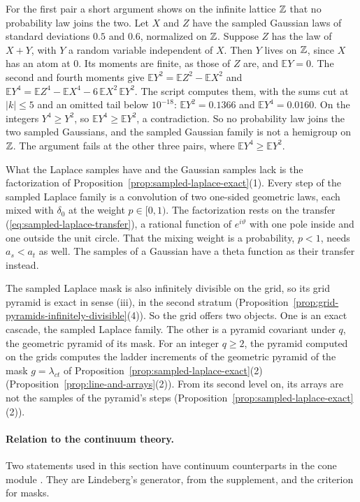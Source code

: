 For the first pair a short argument shows on the infinite lattice $\mathbb{Z}$ that no probability law
joins the two. Let $X$ and $Z$ have the sampled Gaussian laws of standard deviations $0.5$ and
$0.6$, normalized on $\mathbb{Z}$. Suppose $Z$ has the law of $X + Y$, with $Y$ a random variable
independent of $X$. Then $Y$ lives on $\mathbb{Z}$, since
$X$ has an atom at $0$. Its moments are finite, as those of $Z$ are, and $\mathbb{E}Y = 0$. The
second and fourth moments give
$\mathbb{E}Y^2 = \mathbb{E}Z^2 - \mathbb{E}X^2$ and
$\mathbb{E}Y^4 = \mathbb{E}Z^4 - \mathbb{E}X^4 - 6\,\mathbb{E}X^2\,\mathbb{E}Y^2$. The script
computes them, with the sums cut at $|k| \le 5$ and an omitted tail below $10^{-18}$:
$\mathbb{E}Y^2 = 0.1366$ and $\mathbb{E}Y^4 = 0.0160$. On the integers $Y^4 \ge Y^2$, so
$\mathbb{E}Y^4 \ge \mathbb{E}Y^2$, a contradiction. So no probability law joins the two sampled
Gaussians, and the sampled Gaussian family is not a hemigroup on $\mathbb{Z}$. The argument fails at the
other three pairs, where
$\mathbb{E}Y^4 \ge \mathbb{E}Y^2$.

What the Laplace samples have and the Gaussian samples lack is the factorization of
Proposition~\ref{prop:sampled-laplace-exact}(1). Every step of the sampled Laplace family is a
convolution of two one-sided geometric laws, each mixed with $\delta_0$ at the weight
$p \in [0,1)$. The factorization rests on the transfer (\ref{eq:sampled-laplace-transfer}), a
rational function of $e^{i\vartheta}$ with one pole inside and one outside the unit circle. That the
mixing weight is a probability, $p < 1$, needs $a_s < a_t$ as well. The samples of a Gaussian have
a theta function as their transfer instead.

The sampled Laplace mask is also infinitely divisible on the grid, so its grid pyramid is exact in
sense (iii), in the second stratum (Proposition~\ref{prop:grid-pyramids-infinitely-divisible}(4)).
So the grid offers two objects. One is an exact cascade, the sampled Laplace family. The other is a
pyramid covariant under $q$, the geometric pyramid of its mask. For an integer $q \ge 2$, the
\Matern{} pyramid computed on the grids computes the ladder increments of the geometric pyramid of
the mask $g = \lambda_{ct}$ of Proposition~\ref{prop:sampled-laplace-exact}(2)
(Proposition~\ref{prop:line-and-arrays}(2)). From its second level on, its arrays are not the
samples of the \Matern{} pyramid's steps (Proposition~\ref{prop:sampled-laplace-exact}(2)).

\paragraph{Relation to the continuum theory.} Two statements used in this section have continuum
counterparts in the cone module . They are Lindeberg's generator, from the
supplement, and the criterion for masks.

